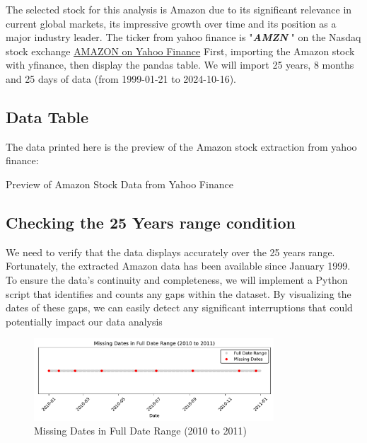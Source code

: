 \documentclass{article}
\begin{document}
The selected stock for this analysis is Amazon due to its significant relevance in current global markets, its impressive growth over time and its position as a major industry leader.
The ticker from yahoo finance is "\textbf{\textit{AMZN}} " on the Nasdaq stock exchange \href{https://finance.yahoo.com/quote/AMZN/.}{AMAZON on Yahoo Finance}
First, importing the Amazon stock with yfinance, then display the pandas table.
We will import 25 years, 8 months and 25 days of data (from 1999-01-21 to 2024-10-16).

\subsection{Data Table}
The data printed here is the preview of the Amazon stock extraction from yahoo finance:
\begin{table}[h!]
    \centering
      
    \caption{Preview of Amazon Stock Data from Yahoo Finance}
    \label{tab:amazon_stock_preview}
\end{table}



\subsection{Checking the 25 Years range condition}


We need to verify that the data displays accurately over the 25 years range. 
Fortunately, the extracted  Amazon data has been available since January 1999. 
To ensure the data’s continuity and completeness, we will implement a Python script that identifies and counts any gaps within the dataset. 
By visualizing the dates of these gaps, we can easily detect any significant interruptions that could potentially impact our data analysis

\begin{figure}[H]
    \centering
    \includegraphics[width=0.8\textwidth]{Img/MissingDates(2010_to_2011).pdf}
    \caption{Missing Dates in Full Date Range (2010 to 2011)}
    \label{fig:missing_dates}
\end{figure}
\end{document}
